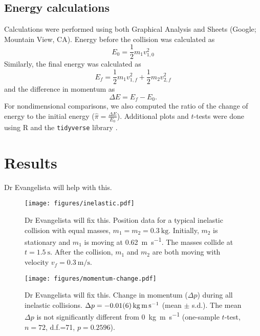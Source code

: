 \documentclass[aps,prl,reprint]{revtex4-1}
\begin{document}
 \subsection{Energy calculations}
 Calculations were performed using both Graphical Analysis and Sheets (Google; Mountain View, CA). 
 Energy before the collision was calculated as
 \begin{equation}
E_0 = \frac{1}{2} m_1 v_{1,0}^2
 \end{equation}
Similarly, the final energy was calculated as
 \begin{equation}
E_f = \frac{1}{2} m_1 v_{1,f}^2 + \frac{1}{2} m_2 v_{2,f}^2
 \end{equation}
and the difference in momentum as 
 \begin{equation}
\Delta E =  E_f - E_0. 
 \end{equation}
For nondimensional comparisons, we also computed the ratio of the change of energy to the initial energy ($\hat{\pi}=\frac{\Delta E}{E_0}$). Additional plots and $t$-tests were done using R \cite{r-2021} and the \lstinline{tidyverse} library \cite{wickham-2019-welcome}. 

\section{Results}
Dr Evangelista will help with this. 

\begin{figure}
\begin{center}
\texttt{[image: figures/inelastic.pdf]}
\end{center}
\caption{Dr Evangelista will fix this. Position data for a typical inelastic collision with equal masses, $m_1=m_2=\SI{0.3}{\kilo\gram}$. Initially, $m_2$ is stationary and $m_1$ is moving at \SI{0.62}{\meter\per\second}. The masses collide at $t=\SI{1.5}{\second}$. After the collision, $m_1$ and $m_2$ are both moving with velocity $v_f=\SI{0.3}{\meter\per\second}$. }
\label{fig:results1}
\end{figure}

\begin{figure}
\begin{center}
\texttt{[image: figures/momentum-change.pdf]}
\end{center}
\caption{Dr Evangelista will fix this. Change in momentum ($\Delta p$) during all inelastic collisions. $\Delta p = \SI{-0.01\pm0.06}{\kilo\gram\meter\per\second}$ (mean $\pm$ s.d.). The mean $\Delta p$ is not significantly different from \SI{0}{\kilo\gram\meter\per\second} (one-sample $t$-test, $n=72$, d.f.=71, $p=0.2596$).}
\label{fig:results2}
\end{figure}
\end{document}

